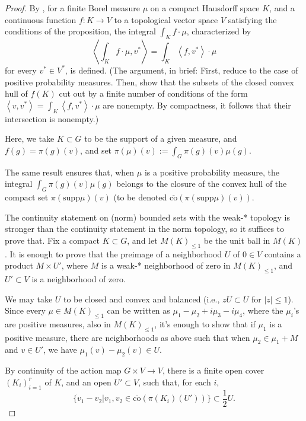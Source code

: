 \begin{proof}
By \cite[Theorem 3.27]{Rudin}, for a finite Borel measure $\mu$ on a compact Hausdorff space $K$, and a continuous function $f:K\to V$ to a topological vector space $V$ satisfying the conditions of the proposition, the integral $\int_K f \cdot \mu$, characterized by 
$$ \left < \int_K f \cdot \mu, v^*\right> = \int_K \left < f , v^*\right> \cdot \mu$$ for every $v^*\in V^*$, is defined. (The argument, in brief: First, reduce to the case of positive probability measures. Then, show that the subsets of the closed convex hull of $f(K)$ cut out by a finite number of conditions of the form $\left < v, v^*\right> = \int_K \left < f , v^*\right> \cdot \mu$ are nonempty. By compactness, it follows that their intersection is nonempty.) 

Here, we take $K \subset G$ to be the support of a given measure, and $f(g) = \pi(g)(v)$, and set $\pi(\mu)(v):= \int_{G} \pi(g)(v) \mu(g)$.

The same result ensures that, when $\mu$ is a positive probability measure, the integral $\int_{G} \pi(g)(v) \mu(g)$ belongs to the closure of the convex hull of the compact set $\pi(\text{supp} \mu)(v)$ (to be denoted $\overline{\text{co}} \left( \pi(\text{supp} \mu)(v) \right)$.

The continuity statement on (norm) bounded sets with the weak-* topology is stronger than the continuity statement in the norm topology, so it suffices to prove that. Fix a compact $K\subset G$, and let $M(K)_{\le 1}$ be the unit ball in $M(K)$. It is enough to prove that the preimage of a neighborhood $U$ of $0\in V$ contains a product $M \times U'$, where $M$ is a weak-* neighborhood of zero in $M(K)_{\le 1}$, and $U'\subset V$ is a neighborhood of zero.

We may take $U$ to be closed and convex and balanced (i.e., $zU\subset U$ for $|z|\le 1$). 
Since every $\mu \in M(K)_{\le 1}$ can be written as $\mu_1 - \mu_2 +i\mu_3-i\mu_4$, where the $\mu_i$'s are positive measures, also in $M(K)_{\le 1}$, it's enough to show that if $\mu_1$ is a positive measure, there are neighborhoods as above such that when $\mu_2 \in \mu_1+M$ and $v\in U'$, we have $\mu_1(v)-\mu_2(v)\in U$. 

By continuity of the action map $G\times V\to V$, there is a finite open cover $(K_i)_{i=1}^r$ of $K$, and an open $U'\subset V$, such that, for each $i$, 
$$ \{ v_1- v_2| v_1, v_2 \in \overline{\text{co}}(\pi(K_i)(U'))\} \subset \frac{1}{2} U.$$


\end{proof}
